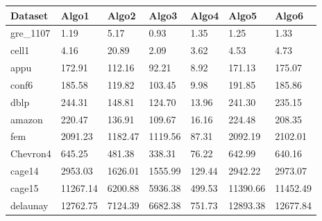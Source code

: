 \begin{center} %
    \begin{tabular}{| l | l | l | l | l | l | l |}
    \hline
	Dataset & Algo1 & Algo2 & Algo3 & Algo4 & Algo5 & Algo6\\ \hline
	gre\_1107 & 1.19 & 5.17 & 0.93 & 1.35 & 1.25 & 1.33 \\ \hline
	cell1 & 4.16 & 20.89 & 2.09 & 3.62 & 4.53 & 4.73\\ \hline
	appu & 172.91 & 112.16 & 92.21 & 8.92 & 171.13 & 175.07\\ \hline
	conf6 & 185.58 & 119.82 & 103.45 & 9.98 & 191.85 & 185.86\\ \hline
	dblp & 244.31 & 148.81 & 124.70 & 13.96 & 241.30 & 235.15\\ \hline
	amazon & 220.47 & 136.91 & 109.67 & 16.16 & 224.48 & 208.35\\ \hline
	fem & 2091.23 & 1182.47 & 1119.56 & 87.31 & 2092.19 & 2102.01\\ \hline
	Chevron4 & 645.25 & 481.38 & 338.31 & 76.22 & 642.99 & 640.16\\ \hline
	cage14 & 2953.03 & 1626.01 & 1555.99 & 129.44 & 2942.22 & 2973.07\\ \hline
	cage15 & 11267.14 & 6200.88 & 5936.38 & 499.53 & 11390.66 & 11452.49\\ \hline
	delaunay & 12762.75 & 7124.39 & 6682.38 & 751.73 & 12893.38 & 12677.84\\ \hline
    \hline
    \end{tabular}
\end{center}
































